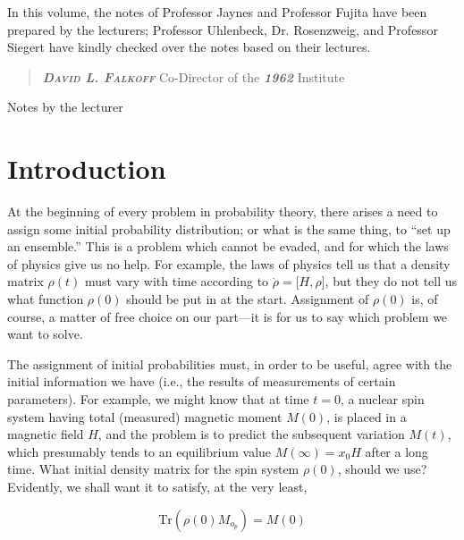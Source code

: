 \documentclass[]{article}
\begin{document}
In this volume, the notes of Professor Jaynes and Professor Fujita have
been prepared by the lecturers; Professor Uhlenbeck, Dr. Rosenzweig, and
Professor Siegert have kindly checked over the notes based on their
lectures.

\begin{quote}
\emph{\textbf{\textsc{David L. Falkoff}}} Co-Director of the
\emph{\textbf{1962}} Institute
\end{quote}

\maketitle 

Notes by the lecturer
\pagebreak

\tableofcontents

\section{Introduction}\label{introduction}

At the beginning of every problem in probability theory, there arises a
need to assign some initial probability distribution; or what is the
same thing, to ``set up an ensemble.'' This is a problem which cannot be
evaded, and for which the laws of physics give us no help. For example,
the laws of physics tell us that a density matrix
\(\rho\left( t \right)\) must vary with time according to
\(\dot{\rho} = \lbrack H,\rho\rbrack\), but they do not
tell us what function \(\rho(0)\) should be put in at the start.
Assignment of \(\rho(0)\) is, of course, a matter of free choice on our
part---it is for us to say which problem we want to solve.

The assignment of initial probabilities must, in order to be useful,
agree with the initial information we have (i.e., the results of
measurements of certain parameters). For example, we might know that at
time \(t = 0\), a nuclear spin system having total (measured) magnetic
moment \(M(0)\), is placed in a magnetic field \(H\), and the problem is
to predict the subsequent variation \(M(t)\), which presumably tends to
an equilibrium value \(M\left( \infty \right) = x_{0}H\) after a long
time. What initial density matrix for the spin system \(\rho(0)\),
should we use? Evidently, we shall want it to satisfy, at the very
least,

\begin{equation}
\text{Tr}\left( \rho(0)M_{o_{p}} \right) = M(0) \label{eqn-one}
\end{equation}
\end{document}
